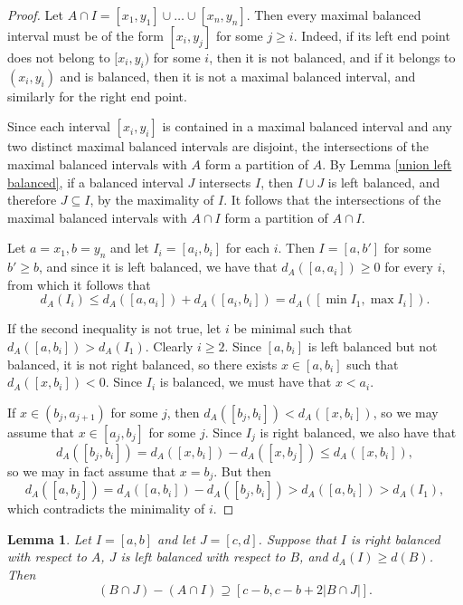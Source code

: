 \documentclass[11pt,reqno]{amsart}
\newtheorem{lemma}[theorem]{Lemma}
\theoremstyle{definition}
\def\subset{\subseteq}
\def\supset{\supseteq}
\begin{document}
\begin{proof}
Let $A\cap I=[x_1,y_1]\cup\dots\cup [x_n,y_n]$. Then every maximal balanced interval must be of the form $[x_i,y_j]$ for some $j\geq i$. Indeed, if its left end point does not belong to $[x_i,y_i)$ for some $i$, then it is not balanced, and if it belongs to $(x_i,y_i)$ and is balanced, then it is not a maximal balanced interval, and similarly for the right end point. 

Since each interval $[x_i,y_i]$ is contained in a maximal balanced interval and any two distinct maximal balanced intervals are disjoint, the intersections of the maximal balanced intervals with $A$ form a partition of $A$. By Lemma \ref{union left balanced}, if a balanced interval $J$ intersects $I$, then $I\cup J$ is left balanced, and therefore $J\subset I$, by the maximality of $I$. It follows that the intersections of the maximal balanced intervals with $A\cap I$ form a partition of $A\cap I$.

Let $a=x_1, b=y_n$ and let $I_i=[a_i,b_i]$ for each $i$. Then $I=[a,b']$ for some $b'\geq b$, and since it is left balanced, we have that $d_A([a,a_i])\geq 0$ for every $i$, from which it follows that 
\[d_A(I_i)\leq d_A([a,a_i])+d_A([a_i,b_i])=d_A([\min I_1,\max I_i]).\]

If the second inequality is not true, let $i$ be minimal such that $d_A([a,b_i])>d_A(I_1)$. Clearly $i\geq 2$. Since $[a,b_i]$ is left balanced but not balanced, it is not right balanced, so there exists $x\in [a,b_i]$ such that $d_A([x,b_i])<0$. Since $I_i$ is balanced, we must have that $x<a_i$. 

If $x\in(b_j,a_{j+1})$ for some $j$, then $d_A([b_j,b_i])<d_A([x,b_i])$, so we may assume that $x\in[a_j,b_j]$ for some $j$. Since $I_j$ is right balanced, we also have that
\[d_A([b_j,b_i])=d_A([x,b_i])-d_A([x,b_j])\leq d_A([x,b_i]),\]
so we may in fact assume that $x=b_j$. But then
\[d_A([a,b_j])=d_A([a,b_i])-d_A([b_j,b_i])>d_A([a,b_i])>d_A(I_1),\]
which contradicts the minimality of $i$. 
\end{proof}

\begin{lemma} \label{main step} Let $I=[a,b]$ and let $J=[c,d]$. Suppose that $I$ is right balanced with respect to $A$, $J$ is left balanced with respect to $B$, and $d_A(I)\geq d(B)$. Then
\[(B\cap J)-(A\cap I)\supset[c-b,c-b+2|B\cap J|].\]
\end{lemma}
\end{document}
